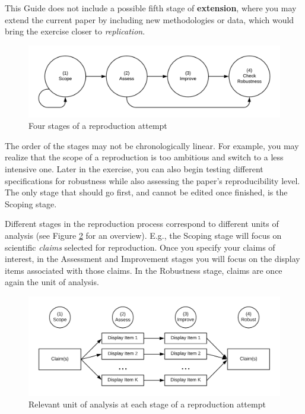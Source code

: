 \documentclass[
]{book}
\begin{document}
This Guide does not include a possible fifth stage of \textbf{extension}, where you may extend the current paper by including new methodologies or data, which would bring the exercise closer to \emph{replication}.

\begin{figure}
\includegraphics[width=1\linewidth]{stages} \caption{Four stages of a reproduction attempt}\label{fig:stages-intro}
\end{figure}

The order of the stages may not be chronologically linear. For example, you may realize that the scope of a reproduction is too ambitious and switch to a less intensive one. Later in the exercise, you can also begin testing different specifications for robustness while also assessing the paper's reproducibility level. The only stage that should go first, and cannot be edited once finished, is the Scoping stage.

Different stages in the reproduction process correspond to different units of analysis (see Figure \ref{fig:stages-unit} for an overview). E.g., the Scoping stage will focus on scientific \emph{claims} selected for reproduction. Once you specify your claims of interest, in the Assessment and Improvement stages you will focus on the display items associated with those claims. In the Robustness stage, claims are once again the unit of analysis.

\begin{figure}
\includegraphics[width=1\linewidth]{unit-of-analysis} \caption{Relevant unit of analysis at each stage of a reproduction attempt}\label{fig:stages-unit}
\end{figure}
\end{document}
